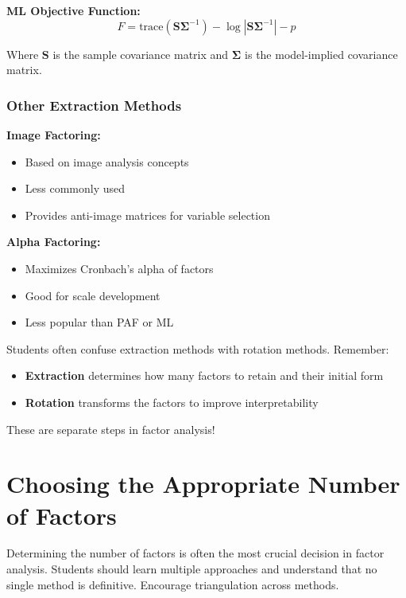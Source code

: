 \documentclass[a4paper]{tufte-book}
\begin{document}
\textbf{ML Objective Function:}
$$F = \text{trace}(\mathbf{S}\boldsymbol{\Sigma}^{-1}) - \log|\mathbf{S}\boldsymbol{\Sigma}^{-1}| - p$$

Where $\mathbf{S}$ is the sample covariance matrix and $\boldsymbol{\Sigma}$ is the model-implied covariance matrix.

\subsection{Other Extraction Methods}

\textbf{Image Factoring:}
\begin{itemize}
\item Based on image analysis concepts
\item Less commonly used
\item Provides anti-image matrices for variable selection
\end{itemize}

\textbf{Alpha Factoring:}
\begin{itemize}
\item Maximizes Cronbach's alpha of factors
\item Good for scale development
\item Less popular than PAF or ML
\end{itemize}

\begin{commonmistake}
Students often confuse extraction methods with rotation methods. Remember:
\begin{itemize}
\item \textbf{Extraction} determines how many factors to retain and their initial form
\item \textbf{Rotation} transforms the factors to improve interpretability
\end{itemize}
These are separate steps in factor analysis!
\end{commonmistake}


\chapter{Choosing the Appropriate Number of Factors}

\begin{pedagogicalnote}
Determining the number of factors is often the most crucial decision in factor analysis. Students should learn multiple approaches and understand that no single method is definitive. Encourage triangulation across methods.
\end{pedagogicalnote}
\end{document}
